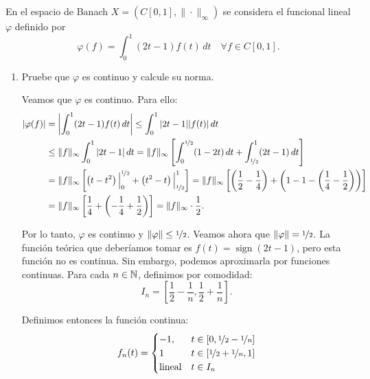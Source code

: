 \documentclass[12pt]{article}
\begin{document}
    \begin{ejercicio}
        En el espacio de Banach $X = (C\left[0, 1\right], \|\cdot\|_\infty)$ se considera el funcional lineal $\varphi$ definido por
        \[
            \varphi(f) = \int_0^1 (2t - 1) f(t) \, dt \quad \forall f \in C\left[0, 1\right].
        \]
        \begin{enumerate}[label=\alph*)]
            \item Pruebe que $\varphi$ es continuo y calcule su norma.
            
            Veamos que $\varphi$ es continuo. Para ello:
            \begin{align*}
                |\varphi(f)| &= \left|\int_0^1 (2t - 1) f(t) \, dt\right| 
                \leq \int_0^1 |2t - 1| |f(t)| \, dt \\
                &\leq \|f\|_\infty \int_0^1 |2t - 1| \, dt
                = \|f\|_\infty \left[\int_0^{\nicefrac{1}{2}} (1 - 2t) \, dt + \int_{\nicefrac{1}{2}}^1 (2t - 1) \, dt\right] \\
                &= \|f\|_\infty \left[\left(t - t^2\right)\Big|_0^{\nicefrac{1}{2}} + \left(t^2 - t\right)\Big|_{\nicefrac{1}{2}}^1\right] = \|f\|_\infty \left[\left(\frac{1}{2} - \frac{1}{4}\right) + \left(1 - 1 - \left(\frac{1}{4} - \frac{1}{2}\right)\right)\right] \\
                &= \|f\|_\infty \left[\frac{1}{4} + \left(-\frac{1}{4} + \frac{1}{2}\right)\right] 
                = \|f\|_\infty \cdot \frac{1}{2}.
            \end{align*}

            Por lo tanto, $\varphi$ es continuo y $\|\varphi\| \leq \nicefrac{1}{2}$. Veamos ahora que $\|\varphi\| = \nicefrac{1}{2}$. La función teórica que deberíamos tomar es $f(t) = \operatorname{sign}(2t - 1)$, pero esta función no es continua. Sin embargo, podemos aproximarla por funciones continuas. Para cada $n \in \mathbb{N}$, definimos por comodidad:
            \begin{equation*}
                I_n = \left[\frac{1}{2} - \frac{1}{n}, \frac{1}{2} + \frac{1}{n}\right].
            \end{equation*}
            
            Definimos entonces la función continua:
            \begin{align*}
                f_n(t) = \begin{cases}
                    -1, & t \in [0, \nicefrac{1}{2} - \nicefrac{1}{n}] \\
                    1 & t \in [\nicefrac{1}{2} + \nicefrac{1}{n}, 1] \\
                    \text{lineal} & t \in I_n
                \end{cases}
            \end{align*}


\end{enumerate}
\end{ejercicio}
\end{document}
